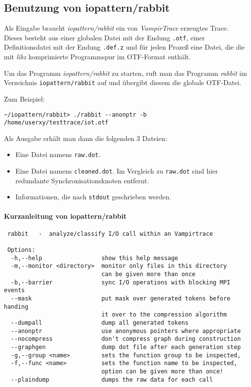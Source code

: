 \documentclass{scrartcl}
\begin{document}
\subsection{Benutzung von iopattern/rabbit} %
Als Eingabe braucht \emph{iopattern/rabbit} ein von \emph{VampirTrace} 
erzeugtes Trace. Dieses besteht aus einer globalen Datei mit der 
Endung \texttt{.otf},
einer Definitionsdatei mit der Endung \texttt{.def.z} und für jeden Prozeß
eine Datei, die die mit \emph{libz} komprimierte Programmspur im OTF-Format
enthält.

Um das Programm \emph{iopattern/rabbit} zu starten, ruft man das Programm 
\emph{rabbit} im Verzeichnis \texttt{iopattern/rabbit} auf und übergibt 
diesem die globale OTF-Datei.

Zum Beispiel:
\begin{verbatim}
~/iopattern/rabbit> ./rabbit --anonptr -b /home/userxy/testtrace/iot.otf
\end{verbatim}

Als Ausgabe erhält man dann die folgenden 3 Dateien:
\begin{itemize}
\item Eine Datei namens \texttt{raw.dot}.
\item Eine Datei namens \texttt{cleaned.dot}. Im Vergleich zu \texttt{raw.dot}
        sind hier redundante Synchronisationsknoten entfernt.
\item Informationen, die nach \texttt{stdout} geschrieben werden.
\end{itemize}

\paragraph{Kurzanleitung von iopattern/rabbit}
\begin{verbatim}
 rabbit   -  analyze/classify I/O call within an Vampirtrace               
                                                                           
 Options:                                                                  
  -h,--help                 show this help message                         
  -m,--monitor <directory>  monitor only files in this directory           
                            can be given more than once                    
  -b,--barrier              sync I/O operations with blocking MPI events   
  --mask                    put mask over generated tokens before handing  
                            it over to the compression algorithm           
  --dumpall                 dump all generated tokens                      
  --anonptr                 use anonymous pointers where appropriate       
  --nocompress              don't compress graph during construction       
  --graphgen                dump dot file after each generation step       
  -g,--group <name>         sets the function group to be inspected,       
  -f,--func <name>          sets the function name to be inspected,        
                            option can be given more than once!            
  --plaindump               dumps the raw data for each call        
\end{verbatim}
\end{document}
